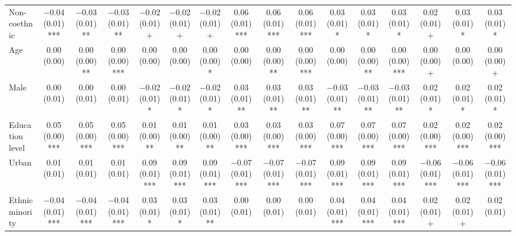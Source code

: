 \begin{table}
\begin{tabular}[t]{lccccccccccccccc}
Non-coethnic & \num{-0.04} (\num{0.01})*** & \num{-0.03} (\num{0.01})** & \num{-0.03} (\num{0.01})** & \num{-0.02} (\num{0.01})+ & \num{-0.02} (\num{0.01})+ & \num{-0.02} (\num{0.01})+ & \num{0.06} (\num{0.01})*** & \num{0.06} (\num{0.01})*** & \num{0.06} (\num{0.01})*** & \num{0.03} (\num{0.01})* & \num{0.03} (\num{0.01})* & \num{0.03} (\num{0.01})* & \num{0.02} (\num{0.01})+ & \num{0.03} (\num{0.01})* & \num{0.03} (\num{0.01})*\\
Age & \num{0.00} (\num{0.00}) & \num{0.00} (\num{0.00})** & \num{0.00} (\num{0.00})*** & \num{0.00} (\num{0.00}) & \num{0.00} (\num{0.00}) & \num{0.00} (\num{0.00})* & \num{0.00} (\num{0.00}) & \num{0.00} (\num{0.00})** & \num{0.00} (\num{0.00})*** & \num{0.00} (\num{0.00}) & \num{0.00} (\num{0.00})** & \num{0.00} (\num{0.00})*** & \num{0.00} (\num{0.00})+ & \num{0.00} (\num{0.00}) & \num{0.00} (\num{0.00})+\\
Male & \num{0.00} (\num{0.01}) & \num{0.00} (\num{0.01}) & \num{0.00} (\num{0.01}) & \num{-0.02} (\num{0.01})* & \num{-0.02} (\num{0.01})* & \num{-0.02} (\num{0.01})* & \num{0.03} (\num{0.01})** & \num{0.03} (\num{0.01})** & \num{0.03} (\num{0.01})** & \num{-0.03} (\num{0.01})** & \num{-0.03} (\num{0.01})** & \num{-0.03} (\num{0.01})** & \num{0.02} (\num{0.01})* & \num{0.02} (\num{0.01})* & \num{0.02} (\num{0.01})*\\
Education level & \num{0.05} (\num{0.00})*** & \num{0.05} (\num{0.00})*** & \num{0.05} (\num{0.00})*** & \num{0.01} (\num{0.00})** & \num{0.01} (\num{0.00})** & \num{0.01} (\num{0.00})** & \num{0.03} (\num{0.00})*** & \num{0.03} (\num{0.00})*** & \num{0.03} (\num{0.00})*** & \num{0.07} (\num{0.00})*** & \num{0.07} (\num{0.00})*** & \num{0.07} (\num{0.00})*** & \num{0.02} (\num{0.00})*** & \num{0.02} (\num{0.00})*** & \num{0.02} (\num{0.00})***\\
Urban & \num{0.01} (\num{0.01}) & \num{0.01} (\num{0.01}) & \num{0.01} (\num{0.01}) & \num{0.09} (\num{0.01})*** & \num{0.09} (\num{0.01})*** & \num{0.09} (\num{0.01})*** & \num{-0.07} (\num{0.01})*** & \num{-0.07} (\num{0.01})*** & \num{-0.07} (\num{0.01})*** & \num{0.09} (\num{0.01})*** & \num{0.09} (\num{0.01})*** & \num{0.09} (\num{0.01})*** & \num{-0.06} (\num{0.01})*** & \num{-0.06} (\num{0.01})*** & \num{-0.06} (\num{0.01})***\\
Ethnic minority & \num{-0.04} (\num{0.01})*** & \num{-0.04} (\num{0.01})*** & \num{-0.04} (\num{0.01})*** & \num{0.03} (\num{0.01})* & \num{0.03} (\num{0.01})* & \num{0.03} (\num{0.01})** & \num{0.00} (\num{0.01}) & \num{0.00} (\num{0.01}) & \num{0.00} (\num{0.01}) & \num{0.04} (\num{0.01})*** & \num{0.04} (\num{0.01})*** & \num{0.04} (\num{0.01})*** & \num{0.02} (\num{0.01})+ & \num{0.02} (\num{0.01})+ & \num{0.02} (\num{0.01})\\

\end{tabular}
\end{table}
